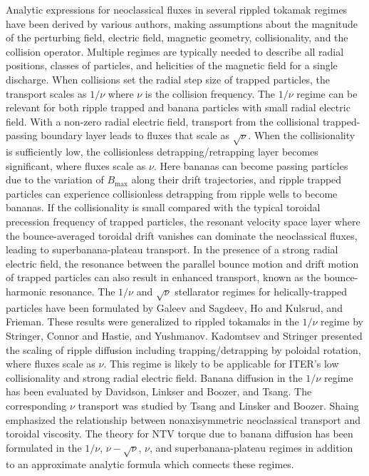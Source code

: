 \documentclass[aip, pop, preprint]{revtex4-1}
\numberwithin{figure}{section}
\numberwithin{equation}{section}
\begin{document}
Analytic expressions for neoclassical fluxes in several rippled tokamak regimes have been derived by various authors, making assumptions about the magnitude of the perturbing field, electric field, magnetic geometry, collisionality, and the collision operator. Multiple regimes are typically needed to describe all radial positions, classes of particles, and helicities of the magnetic field for a single discharge. When collisions set the radial step size of trapped particles, the transport scales as $1/\nu$ where $\nu$ is the collision frequency. The $1/\nu$ regime can be relevant for both ripple trapped and banana particles with small radial electric field. With a non-zero radial electric field, transport from the collisional trapped-passing boundary layer leads to fluxes that scale as $\sqrt{\nu}$. When the collisionality is sufficiently low, the collisionless detrapping/retrapping layer becomes significant, where fluxes scale as $\nu$. Here bananas can become passing particles due to the variation of $B_{\max}$ along their drift trajectories,\cite{Shaing2009} and ripple trapped particles can experience collisionless detrapping from ripple wells to become bananas.\cite{Shaing1982a, Shaing1982b} If the collisionality is small compared with the typical toroidal precession frequency of trapped particles, the resonant velocity space layer where the bounce-averaged toroidal drift vanishes can dominate the neoclassical fluxes, leading to superbanana-plateau transport.\cite{Shaing2009_sbp} In the presence of a strong radial electric field, the resonance between the parallel bounce motion and drift motion of trapped particles can also result in enhanced transport, known as the bounce-harmonic resonance.\cite{Linsker1982,Park2009} The $1/\nu$ and $\sqrt{\nu}$ stellarator regimes for helically-trapped particles have been formulated by Galeev and Sagdeev,\cite{Galeev1969} Ho and Kulsrud,\cite{Ho1987} and Frieman.\cite{Frieman1970} These results were generalized to rippled tokamaks in the $1/\nu$ regime by Stringer,\cite{Stringer1972} Connor and Hastie,\cite{Connor1973} and Yushmanov.\cite{Yushmanov1982} Kadomtsev\cite{Kadomtsev1971} and Stringer\cite{Stringer1972} presented the scaling of ripple diffusion including trapping/detrapping by poloidal rotation, where fluxes scale as $\nu$. This regime is likely to be applicable for ITER's low collisionality and strong radial electric field. Banana diffusion in the $1/\nu$ regime has been evaluated by Davidson,\cite{Davidson1976} Linkser and Boozer,\cite{Linsker1982} and Tsang.\cite{Tsang1977} The corresponding $\nu$ transport was studied by Tsang\cite{Tsang1977} and Linsker and Boozer.\cite{Linsker1982} Shaing emphasized the relationship between nonaxisymmetric neoclassical transport and toroidal viscosity.\cite{Shaing1983} The theory for NTV torque due to banana diffusion has been formulated in the $1/\nu$,\cite{Shaing2003} $\nu-\sqrt{\nu}$,\cite{Shaing2008} $\nu$,\cite{Shaing2009} and superbanana-plateau \cite{Shaing2009_sbp} regimes in addition to an approximate analytic formula which connects these regimes.\cite{Shaing2010}
\end{document}
